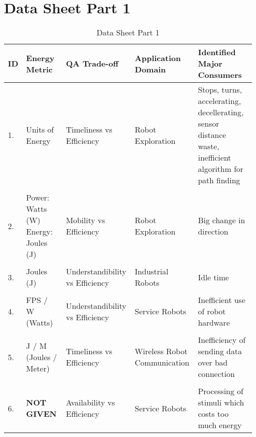 \section{Data Sheet Part 1}
\label{appendix:data_sheet_1}

\begin{table}[h]
    \centering
    \caption{Data Sheet Part 1}
    \begin{tabular}{p{0.1cm}p{3cm}p{4cm}p{4cm}p{4cm}}
        \toprule
            {ID} &
                {Energy Metric}      & 
                {QA Trade-off}       & 
                {Application Domain} &
                {Identified Major Consumers}    \\
        \midrule
            {1.} &
                {Units of Energy} &
                {Timeliness vs Efficiency} &
                {Robot Exploration} &
                {Stops, turns, accelerating, decellerating, sensor distance waste, 
                inefficient algorithm for path finding} \\
            \hline
            \\
            {2.} &
                {Power: Watts (W)
                Energy: Joules (J)} &
                {Mobility vs Efficiency} &
                {Robot Exploration} &
                {Big change in direction} \\
            \hline
            \\
            {3.} &
                {Joules (J)} &
                {Understandibility vs Efficiency} &
                {Industrial Robots} &
                {Idle time} \\
            \hline
            \\
            {4.} &
                {FPS / W (Watts)} &
                {Understandibility vs Efficiency} &
                {Service Robots} &
                {Inefficient use of robot hardware} \\
            \hline
            \\
            {5.} &
                {J / M (Joules / Meter)} &
                {Timeliness vs Efficiency} &
                {Wireless Robot Communication} &
                {Inefficiency of sending data over bad connection} \\
            \hline
            \\
            {6.} &
                {\textbf{NOT GIVEN}} &
                {Availability vs Efficiency} &
                {Service Robots} &
                {Processing of stimuli which costs too much energy} \\

\end{tabular}
\end{table}
